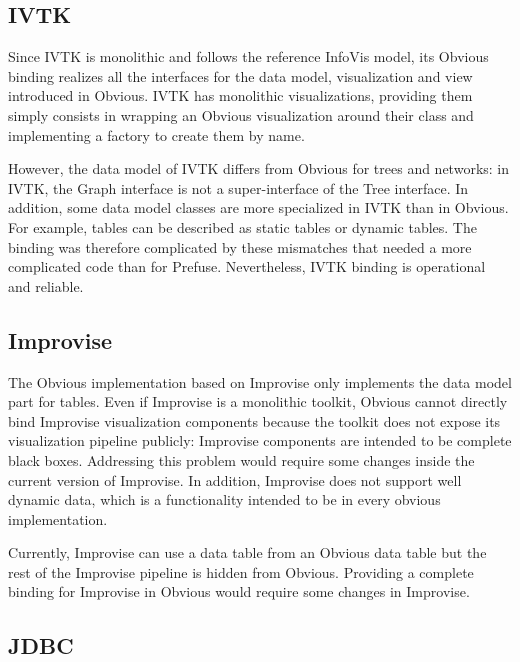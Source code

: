 
\subsection{IVTK}

Since IVTK is monolithic and follows the reference
InfoVis model, its Obvious binding realizes all the
interfaces for the data model, visualization and view introduced in
Obvious. IVTK has monolithic visualizations, providing
them simply consists in wrapping an Obvious visualization around their
class and implementing a factory to create them by name.

However, the data model of IVTK differs from Obvious
for trees and networks: in IVTK, the Graph interface is
not a super-interface of the Tree interface.  In addition, some data
model classes are more specialized in IVTK than in
Obvious.  For example, tables can be described as static tables or
dynamic tables.  The binding was therefore complicated by these
mismatches that needed a more complicated code than for Prefuse.
Nevertheless, IVTK binding is operational and
reliable.

\subsection{Improvise}

The Obvious implementation based on Improvise only
implements the data model part for tables.  Even if Improvise is a
monolithic toolkit, Obvious cannot directly bind Improvise
visualization components because the toolkit does not expose its
visualization pipeline publicly: Improvise components are intended to
be complete black boxes.  Addressing this problem would require some
changes inside the current version of Improvise. In addition,
Improvise does not support well dynamic data, which is a functionality
intended to be in every obvious implementation.

Currently, Improvise can use a data table from an Obvious data table
but the rest of the Improvise pipeline is hidden from
Obvious. Providing a complete binding for Improvise in Obvious would
require some changes in Improvise.

\subsection{JDBC}

